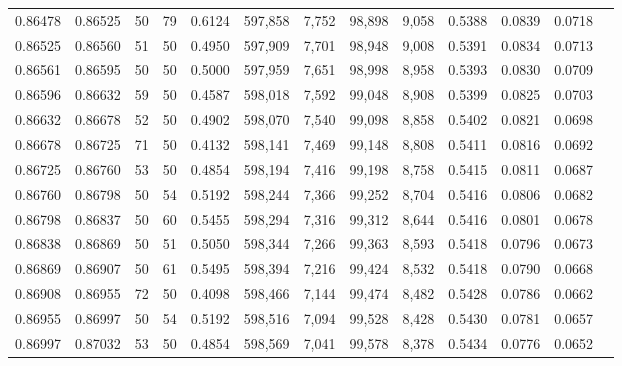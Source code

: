 \begin{tabular}{rrrrrrrrrrrrr}
0.86478 & 0.86525 &    50 &  79 &                                     0.6124 & 597,858 &   7,752 &  98,898 &   9,058 & 0.5388 & 0.0839 & 0.0718 \\
0.86525 & 0.86560 &    51 &  50 &                                     0.4950 & 597,909 &   7,701 &  98,948 &   9,008 & 0.5391 & 0.0834 & 0.0713 \\
0.86561 & 0.86595 &    50 &  50 &                                     0.5000 & 597,959 &   7,651 &  98,998 &   8,958 & 0.5393 & 0.0830 & 0.0709 \\
0.86596 & 0.86632 &    59 &  50 &                                     0.4587 & 598,018 &   7,592 &  99,048 &   8,908 & 0.5399 & 0.0825 & 0.0703 \\
0.86632 & 0.86678 &    52 &  50 &                                     0.4902 & 598,070 &   7,540 &  99,098 &   8,858 & 0.5402 & 0.0821 & 0.0698 \\
0.86678 & 0.86725 &    71 &  50 &                                     0.4132 & 598,141 &   7,469 &  99,148 &   8,808 & 0.5411 & 0.0816 & 0.0692 \\
0.86725 & 0.86760 &    53 &  50 &                                     0.4854 & 598,194 &   7,416 &  99,198 &   8,758 & 0.5415 & 0.0811 & 0.0687 \\
0.86760 & 0.86798 &    50 &  54 &                                     0.5192 & 598,244 &   7,366 &  99,252 &   8,704 & 0.5416 & 0.0806 & 0.0682 \\
0.86798 & 0.86837 &    50 &  60 &                                     0.5455 & 598,294 &   7,316 &  99,312 &   8,644 & 0.5416 & 0.0801 & 0.0678 \\
0.86838 & 0.86869 &    50 &  51 &                                     0.5050 & 598,344 &   7,266 &  99,363 &   8,593 & 0.5418 & 0.0796 & 0.0673 \\
0.86869 & 0.86907 &    50 &  61 &                                     0.5495 & 598,394 &   7,216 &  99,424 &   8,532 & 0.5418 & 0.0790 & 0.0668 \\
0.86908 & 0.86955 &    72 &  50 &                                     0.4098 & 598,466 &   7,144 &  99,474 &   8,482 & 0.5428 & 0.0786 & 0.0662 \\
0.86955 & 0.86997 &    50 &  54 &                                     0.5192 & 598,516 &   7,094 &  99,528 &   8,428 & 0.5430 & 0.0781 & 0.0657 \\
0.86997 & 0.87032 &    53 &  50 &                                     0.4854 & 598,569 &   7,041 &  99,578 &   8,378 & 0.5434 & 0.0776 & 0.0652 \\

\end{tabular}
